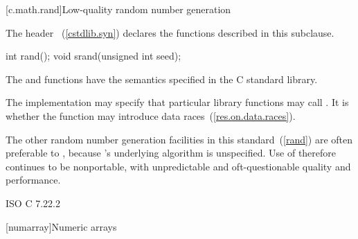 [c.math.rand]{Low-quality random number generation}

\pnum
{}%
\begin{note}
The header ~(\ref{cstdlib.syn})
declares the functions described in this subclause.
\end{note}

%
%
\begin{itemdecl}
int rand();
void srand(unsigned int seed);
\end{itemdecl}

\begin{itemdescr}
\pnum
\effects
The
 and 
functions have the semantics specified in the C standard library.

\pnum
\remarks
The implementation
may specify that particular library functions may call
.
It is 
whether the  function
may introduce data races~(\ref{res.on.data.races}).
\begin{note}
%
The other random
number generation facilities in this standard~(\ref{rand}) are often preferable
to , because 's underlying algorithm is unspecified.
Use of  therefore continues to be nonportable, with unpredictable
and oft-questionable quality and performance.
\end{note}
\end{itemdescr}

\xref ISO C 7.22.2



[numarray]{Numeric arrays}

